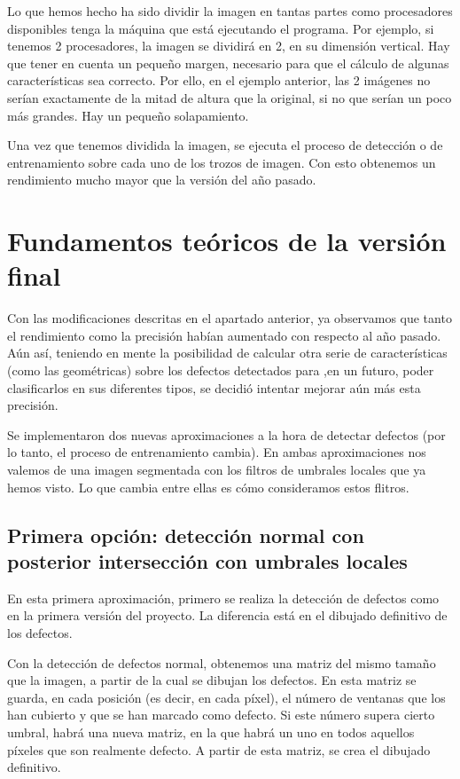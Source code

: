 Lo que hemos hecho ha sido dividir la imagen en tantas partes como procesadores disponibles tenga la máquina que está ejecutando el programa. Por ejemplo, si tenemos 2 procesadores, la imagen se dividirá en 2, en su dimensión vertical. Hay que tener en cuenta un pequeño margen, necesario para que el cálculo de algunas características sea correcto. Por ello, en el ejemplo anterior, las 2 imágenes no serían exactamente de la mitad de altura que la original, si no que serían un poco más grandes. Hay un pequeño solapamiento.

Una vez que tenemos dividida la imagen, se ejecuta el proceso de detección o de entrenamiento sobre cada uno de los trozos de imagen. Con esto obtenemos un rendimiento mucho mayor que la versión del año pasado.


\section{Fundamentos teóricos de la versión final}
Con las modificaciones descritas en el apartado anterior, ya observamos que tanto el rendimiento como la precisión habían aumentado con respecto al año pasado. Aún así, teniendo en mente la posibilidad de calcular otra serie de características (como las geométricas) sobre los defectos detectados para ,en un futuro, poder clasificarlos en sus diferentes tipos, se decidió intentar mejorar aún más esta precisión.

Se implementaron dos nuevas aproximaciones a la hora de detectar defectos (por lo tanto, el proceso de entrenamiento cambia). En ambas aproximaciones nos valemos de una imagen segmentada con los filtros de umbrales locales que ya hemos visto. Lo que cambia entre ellas es cómo consideramos estos flitros.

\subsection{Primera opción: detección normal con posterior intersección con umbrales locales}
En esta primera aproximación, primero se realiza la detección de defectos como en la primera versión del proyecto. La diferencia está en el dibujado definitivo de los defectos.

Con la detección de defectos normal, obtenemos una matriz del mismo tamaño que la imagen, a partir de la cual se dibujan los defectos. En esta matriz se guarda, en cada posición (es decir, en cada píxel), el número de ventanas que los han cubierto y que se han marcado como defecto. Si este número supera cierto umbral, habrá una nueva matriz, en la que habrá un uno en todos aquellos píxeles que son realmente defecto. A partir de esta matriz, se crea el dibujado definitivo.

